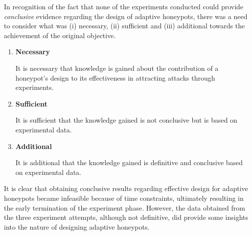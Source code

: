 In recognition of the fact that none of the experiments conducted could provide \textit{conclusive} evidence regarding the design of adaptive honeypots, there was a need to consider what was (i) necessary, (ii) sufficient and (iii) additional towards the achievement of the original objective.

\begin{enumerate}
\item \textbf{Necessary}

It is necessary that knowledge is gained about the contribution of a honeypot's design to its effectiveness in attracting attacks through experiments. 
\item \textbf{Sufficient}

It is sufficient that the knowledge gained is not conclusive but is based on experimental data.

\item \textbf{Additional}

It is additional that the knowledge gained is definitive and conclusive based on experimental data.

\end{enumerate}
It is clear that obtaining conclusive results regarding effective design for adaptive honeypots  became infeasible because of time constraints, ultimately resulting in the early termination of the experiment phase. However, the data obtained from the three experiment attempts, although not definitive, did provide some insights into the nature of designing adaptive honeypots.

